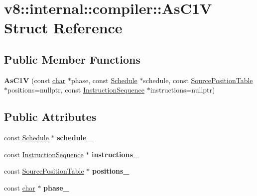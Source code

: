 \hypertarget{structv8_1_1internal_1_1compiler_1_1AsC1V}{}\section{v8\+:\+:internal\+:\+:compiler\+:\+:As\+C1V Struct Reference}
\label{structv8_1_1internal_1_1compiler_1_1AsC1V}
\subsection*{Public Member Functions}
\begin{DoxyCompactItemize}
\item 
\mbox{\label{structv8_1_1internal_1_1compiler_1_1AsC1V_ab07075a3ab7e2376d3a1386d9012911c}} 
{\bfseries As\+C1V} (const \mbox{\hyperlink{classchar}{char}} $\ast$phase, const \mbox{\hyperlink{classv8_1_1internal_1_1compiler_1_1Schedule}{Schedule}} $\ast$schedule, const \mbox{\hyperlink{classv8_1_1internal_1_1compiler_1_1SourcePositionTable}{Source\+Position\+Table}} $\ast$positions=nullptr, const \mbox{\hyperlink{classv8_1_1internal_1_1compiler_1_1InstructionSequence}{Instruction\+Sequence}} $\ast$instructions=nullptr)
\end{DoxyCompactItemize}
\subsection*{Public Attributes}
\begin{DoxyCompactItemize}
\item 
\mbox{\label{structv8_1_1internal_1_1compiler_1_1AsC1V_a70da8ae295a48ad94170a23b98c714b4}} 
const \mbox{\hyperlink{classv8_1_1internal_1_1compiler_1_1Schedule}{Schedule}} $\ast$ {\bfseries schedule\+\_\+}
\item 
\mbox{\label{structv8_1_1internal_1_1compiler_1_1AsC1V_ac03fd49601725862023437474e702b60}} 
const \mbox{\hyperlink{classv8_1_1internal_1_1compiler_1_1InstructionSequence}{Instruction\+Sequence}} $\ast$ {\bfseries instructions\+\_\+}
\item 
\mbox{\label{structv8_1_1internal_1_1compiler_1_1AsC1V_a33f639b804e5589874dedc81f1824f5f}} 
const \mbox{\hyperlink{classv8_1_1internal_1_1compiler_1_1SourcePositionTable}{Source\+Position\+Table}} $\ast$ {\bfseries positions\+\_\+}
\item 
\mbox{\label{structv8_1_1internal_1_1compiler_1_1AsC1V_ae93a6721597cb97ae1c6efb5cde259a9}} 
const \mbox{\hyperlink{classchar}{char}} $\ast$ {\bfseries phase\+\_\+}
\end{DoxyCompactItemize}


